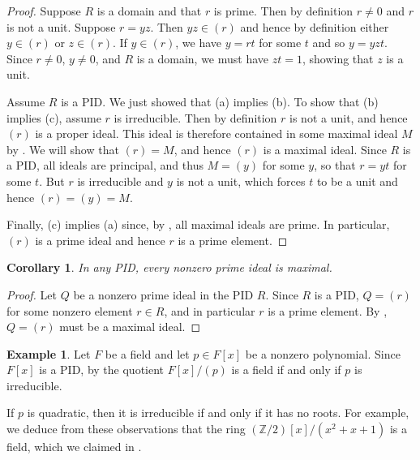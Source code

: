 \documentclass[12pt]{report}
\newtheorem{corollary}[theorem]{Corollary}
\numberwithin{equation}{section}
\numberwithin{theorem}{chapter}
\theoremstyle{definition}
\newtheorem{example}[theorem]{Example}
\newtheorem*{basic properties}{Basic Properties}
\newtheorem*{Important Remark}{Important Remark}
\begin{document}
\begin{proof} 
Suppose $R$ is a domain and that $r$ is prime. Then by definition $r \neq 0$ and $r$ is not a unit. Suppose $r = yz$. Then $yz \in (r)$ and hence by definition either $y \in (r)$ or $z \in (r)$. If $y \in (r)$, we have $y = rt$ for some $t$ and so $y = yzt$. Since $r \neq 0$, $y \neq 0$, and $R$ is a domain, we must have $zt = 1$, showing that $z$ is a unit.

Assume $R$ is a PID. We just showed that (a) implies (b).
To show that (b) implies (c), assume $r$ is irreducible. Then by definition $r$ is not a unit, and hence $(r)$ is a proper ideal. This ideal is therefore contained in some maximal ideal $M$ by . We will show that $(r)= M$, and hence $(r)$ is a maximal ideal.
Since $R$ is a PID, all ideals are principal, and thus $M = (y)$ for some $y$, so that $r = yt$ for some $t$. But $r$ is irreducible and $y$ is not a unit, which forces $t$ to be a unit and hence $(r) = (y) = M$.

Finally, (c) implies (a) since,
by , all maximal ideals are prime. In particular, $(r)$ is a prime ideal and hence $r$ is a prime element.
\end{proof}



\begin{corollary}\label{pid all nonzero primes are max}
In any PID, every nonzero prime ideal is maximal.
\end{corollary}

\begin{proof}
	Let $Q$ be a nonzero prime ideal in the PID $R$. Since $R$ is a PID, $Q = (r)$ for some nonzero element $r \in R$, and in particular $r$ is a prime element. By , $Q = (r)$ must be a maximal ideal.
\end{proof}



\begin{example} 
Let $F$ be a field and let $p \in F[x]$ be a nonzero polynomial. Since $F[x]$ is a PID, by  the quotient $F[x]/(p)$ is a field if and only if $p$ is irreducible.

If $p$ is quadratic, then it is irreducible if and only if it has no roots. 
For example, we deduce from these observations that the ring $(\mathbb{Z}/2)[x]/(x^2+x+1)$ is a field, which we claimed in .
\end{example}
\end{document}
